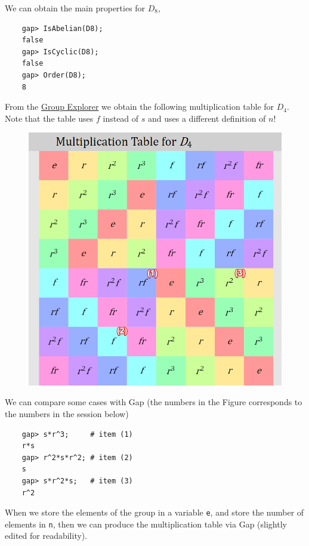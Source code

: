 We can obtain the main properties for $D_8$,

\begin{verbatim}
    gap> IsAbelian(D8);
    false
    gap> IsCyclic(D8);
    false
    gap> Order(D8);
    8
\end{verbatim}

From the \href{https://nathancarter.github.io/group-explorer/Multtable.html?groupURL=https://nathancarter.github.io/group-explorer/groups/D_4.group}{Group Explorer} we obtain the following multiplication table for $D_4$. Note that the table uses $f$ instead of $s$ and uses a different definition of $n$!

\begin{figure}[H]
    \centering
    \includegraphics[scale=0.35]{images/2023-06-05_groups_gap_D4.png}
\end{figure}

We can compare some cases with Gap (the numbers in the Figure corresponds to the numbers in the session below)

\begin{verbatim}
    gap> s*r^3;     # item (1)
    r*s
    gap> r^2*s*r^2; # item (2)
    s
    gap> s*r^2*s;   # item (3)
    r^2
\end{verbatim}

When we store the elements of the group in a variable \verb+e+, and store the number of elements in \verb+n+, then we can produce the multiplication table via Gap (slightly edited for readability).

